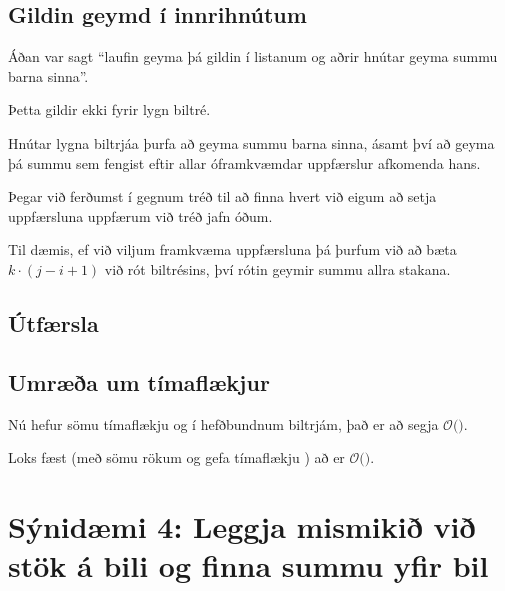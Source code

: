 \subsection{Gildin geymd í innrihnútum}
{
    {
        \item<1-> Áðan var sagt ``laufin geyma þá gildin í listanum og aðrir hnútar geyma summu barna sinna''.
        \item<2-> Þetta gildir ekki fyrir lygn biltré.
        \item<3-> Hnútar lygna biltrjáa þurfa að geyma summu barna sinna,
                    ásamt því að geyma þá summu sem fengist eftir allar óframkvæmdar uppfærslur afkomenda hans.
        \item<4-> Þegar við ferðumst í gegnum tréð til að finna hvert við eigum að setja uppfærsluna uppfærum við tréð jafn óðum.
        \item<5-> Til dæmis, ef við viljum framkvæma uppfærsluna  þá þurfum við að bæta $k \cdot (j - i + 1)$ við rót biltrésins,
                    því rótin geymir summu allra stakana.
    }
}

\subsection{Útfærsla}
{
}

\subsection{Umræða um tímaflækjur}
{
    {
        \item<1-> Nú hefur  sömu tímaflækju og í hefðbundnum biltrjám, það er að segja $\mathcal{O}($$)$.
        \item<3-> Loks fæst (með sömu rökum og gefa tímaflækju ) að  er
                    $\mathcal{O}($$)$.
    }
}

\section{Sýnidæmi 4: Leggja mismikið við stök á bili og finna summu yfir bil}
